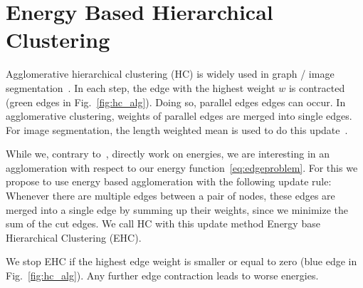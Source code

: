 \documentclass[10pt,twocolumn,letterpaper]{article}
\theoremstyle{definition}
\begin{document}

%
%


\section{Energy Based Hierarchical Clustering}\label{sec:ehc}
Agglomerative hierarchical clustering (HC) is widely used
in graph / image segmentation~\cite{arbelaez_2006}.
In each step, the edge with the highest weight $w$ is
contracted (green edges in Fig.~\ref{fig:hc_alg}).
Doing so, parallel edges edges can occur.
In agglomerative clustering, weights of
parallel edges are merged into single edges.
For image segmentation, the length
weighted mean is used to do this update~\cite{arbelaez_2006}.

While we, contrary to~\cite{arbelaez_2006}, directly work on energies, we are interesting in an 
agglomeration with respect to our energy function~\ref{eq:edgeproblem}.
For this we propose to use energy based agglomeration
with the following update rule:
Whenever there are multiple edges between 
a pair of nodes, these edges are merged into a single edge
by summing up their weights, since we 
minimize the sum of the cut edges.
We call HC with this update method Energy base Hierarchical Clustering (EHC).

We stop EHC if the highest edge weight is
smaller or equal to zero  (blue edge in Fig.~\ref{fig:hc_alg}). Any further edge
contraction leads to worse energies.




\end{document}

